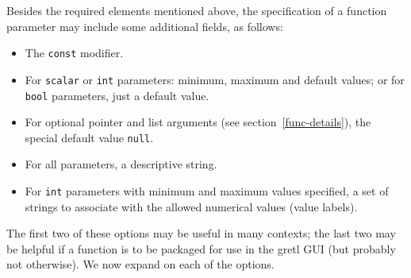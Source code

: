 Besides the required elements mentioned above, the specification of a
function parameter may include some additional fields, as follows:
\begin{itemize}
\item The \texttt{const} modifier.
\item For \texttt{scalar} or \texttt{int} parameters: minimum, maximum
  and default values; or for \texttt{bool} parameters, just a default
  value.
\item For optional pointer and list arguments (see
  section~\ref{func-details}), the special default value
  \texttt{null}.
\item For all parameters, a descriptive string.
\item For \texttt{int} parameters with minimum and maximum values
  specified, a set of strings to associate with the allowed numerical
  values (value labels).
\end{itemize}

The first two of these options may be useful in many contexts; the
last two may be helpful if a function is to be packaged for use in
the gretl GUI (but probably not otherwise). We now expand on
each of the options.

